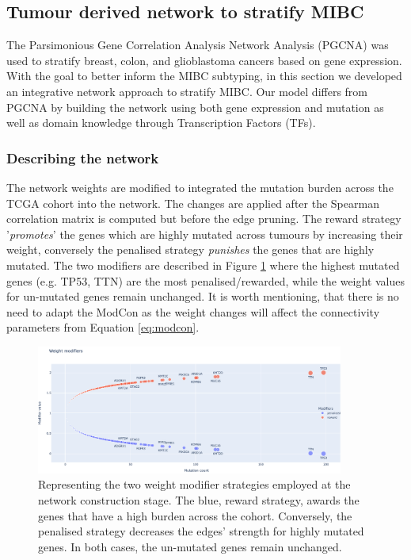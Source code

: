 \subsection{Tumour derived network to stratify MIBC} \label{s:N_I:tum}


The Parsimonious Gene Correlation Analysis Network Analysis (PGCNA) was used to stratify breast, colon, and glioblastoma cancers \cite{Care2019-ij,Tanner2023-wa} based on gene expression. With the goal to better inform the MIBC subtyping, in this section we developed an integrative network approach to stratify MIBC. Our model differs from PGCNA by building the network using both gene expression and mutation as well as  domain knowledge through Transcription Factors (TFs).

\subsubsection{Describing the network} \label{s:N_I:tum_describe}

The network weights are modified to integrated the mutation burden across the TCGA cohort into the network. The changes are applied after the Spearman correlation matrix is computed but before the edge pruning. The reward strategy '\textit{promotes}' the genes which are highly mutated across tumours by increasing their weight, conversely the penalised strategy \textit{punishes} the genes that are highly mutated. The two modifiers are described in Figure \ref{fig:N_I:modifiers} where the highest mutated genes (e.g. TP53, TTN) are the most penalised/rewarded, while the weight values for un-mutated genes remain unchanged. It is worth mentioning, that there is no need to adapt the ModCon as the weight changes will affect the connectivity parameters from Equation \ref{eq:modcon}.

\begin{figure}[!htb]    \centering\includegraphics[width=0.9\textwidth,height=0.9\textheight,keepaspectratio]{Sections/Network_I/Resources/Methods/modifiers.png}
    \caption{Representing the two weight modifier strategies employed at the network construction stage. The blue, reward strategy, awards the genes that have a high burden across the cohort. Conversely, the  penalised strategy decreases the edges' strength for highly mutated genes. In both cases, the un-mutated genes remain unchanged.}
    \label{fig:N_I:modifiers}
\end{figure}


